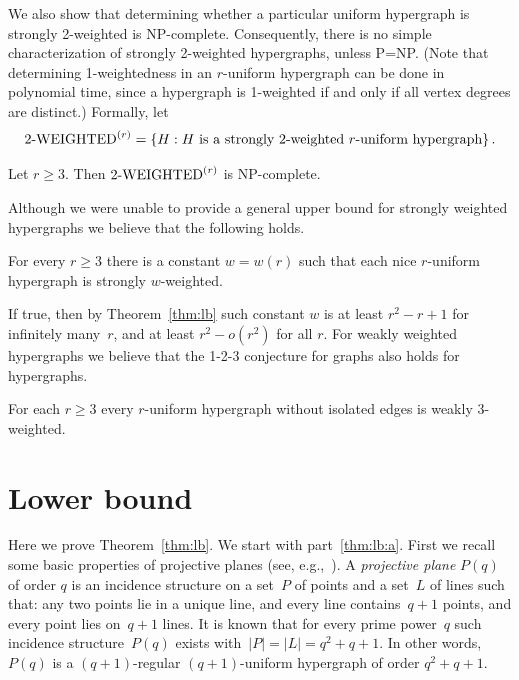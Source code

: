 \documentclass[12pt,reqno]{amsart}
\begin{document}
We also show that determining whether a particular uniform hypergraph is strongly 2-weighted is NP-complete. Consequently, there is no simple characterization of strongly 2-weighted hypergraphs, unless P=NP. (Note that determining 1-weightedness in an $r$-uniform hypergraph can be done in polynomial time, since a hypergraph is 1-weighted if and only if all vertex degrees are distinct.) 
Formally, let
\[
\mbox{2-WEIGHTED}^{{(r)}} = \left\{H : H \text{ is a strongly 2-weighted $r$-uniform hypergraph}\right\}.
\]
\begin{theorem}\label{thm:np}
Let $r\ge 3$. Then $\mbox{2-WEIGHTED}^{{(r)}}$ is NP-complete.
\end{theorem}

Although we were unable to provide a general upper bound for strongly weighted hypergraphs we believe that the following holds.
\begin{conjecture}
For every $r\ge 3$ there is a constant $w=w(r)$ such that each nice $r$-uniform hypergraph is strongly $w$-weighted.
\end{conjecture}
\noindent
If true, then by Theorem~\ref{thm:lb} such constant $w$ is at least $r^2-r+1$ for infinitely many~$r$, and at least $r^2 - o(r^2)$ for all $r$. For weakly weighted hypergraphs we believe that the 1-2-3 conjecture for graphs also holds for hypergraphs.
\begin{conjecture}
For each $r\ge 3$ every $r$-uniform hypergraph without isolated edges is weakly $3$-weighted.
\end{conjecture}

\section{Lower bound}

Here we prove Theorem~\ref{thm:lb}. We start with part~\ref{thm:lb:a}.
First we recall some basic properties of projective planes (see, e.g.,~\cite{GG}).
A \textit{projective plane} $P(q)$ of order $q$ is an incidence structure on a set~${P}$ of points and a set~$L$ of lines such that: any two points lie in a unique line, and every line contains~$q+1$ points, and every point lies on~$q+1$ lines.
It is known that for every prime power~$q$ such incidence structure~$P(q)$ exists with~$|{P}|=|L|=q^2+q+1$.
In other words, $P(q)$ is a $(q+1)$-regular  $(q+1)$-uniform hypergraph of order $q^2+q+1$.
\end{document}

